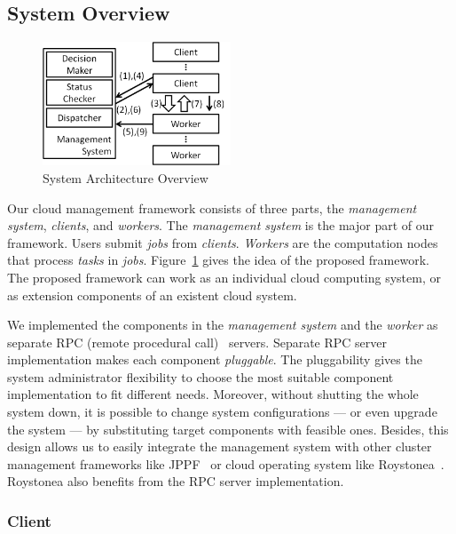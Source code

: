 \subsection{System Overview}	%

\begin{figure}[htbp]
\centering
\includegraphics[width = 0.5\textwidth, bb=0 0 490 350]{./figures/flow.png}
\caption{System Architecture Overview}
\label{fig:archi-overview}
\end{figure}

Our cloud management framework consists of three parts, the {\em
management system}, {\em clients}, and {\em workers}.
The {\em management system} is the major part of our framework.  Users
submit {\em jobs} from {\em clients}.
{\em Workers} are the computation nodes that process {\em tasks} in {\em
jobs}.
Figure~\ref{fig:archi-overview} gives the idea of the proposed
framework.
The proposed framework can work as an individual cloud computing system,
or as extension components of an existent cloud system.

We implemented the components in the {\em management system} and the
{\em worker} as separate RPC (remote procedural call)~\cite{cite:RPC}
servers.
Separate RPC server implementation makes each component {\em pluggable}.
The pluggability gives the system administrator flexibility to choose
the most suitable component implementation to fit different needs.
Moreover, without shutting the whole system down, it is possible to
change system configurations --- or even upgrade the system --- by
substituting target components with feasible ones.
Besides, this design allows us to easily integrate the management system
with other cluster management frameworks like JPPF~\cite{cite:JPPF} or
cloud operating system like Roystonea~\cite{cite:roystonea}.
Roystonea also benefits from the RPC server implementation.


\subsubsection{Client}	%

